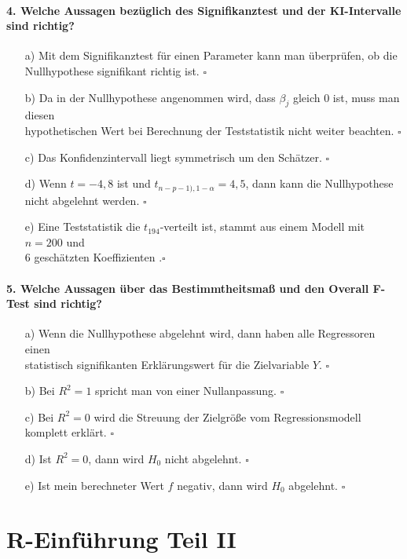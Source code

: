 \documentclass[a4paper]{article}
\begin{document}
\paragraph{4. Welche Aussagen bezüglich des Signifikanztest und der KI-Intervalle sind richtig?}
\begin{itemize}
    \item[a)] Mit dem Signifikanztest für einen Parameter kann man überprüfen, ob die\\ Nullhypothese signifikant richtig ist. \hfill $\square$
    \item[b)] Da in der Nullhypothese angenommen wird, dass $\beta_j$ gleich 0 ist, muss man diesen\\ hypothetischen Wert bei Berechnung der Teststatistik nicht weiter beachten. \hfill $\square$
    \item[c)] Das Konfidenzintervall liegt symmetrisch um den Schätzer. \hfill $\square$
    \item[d)] Wenn $t = -4,8$ ist und $t_{n-p-1),1-\alpha} = 4,5$, dann kann die Nullhypothese\\nicht abgelehnt werden. \hfill $\square$
    \item[e)] Eine Teststatistik die $t_{194}$-verteilt ist, stammt aus einem Modell mit $n = 200$ und\\6 geschätzten Koeffizienten .\hfill $\square$
\end{itemize}

\paragraph{5. Welche Aussagen über das Bestimmtheitsmaß und den Overall F-Test sind richtig?}
\begin{itemize}
    \item[a)] Wenn die Nullhypothese abgelehnt wird, dann haben alle Regressoren einen\\ statistisch signifikanten Erklärungswert für die Zielvariable $Y$. \hfill $\square$
    \item[b)] Bei $R^2=1$ spricht man von einer Nullanpassung. \hfill $\square$
    \item[c)] Bei $R^2=0$ wird die Streuung der Zielgröße vom Regressionsmodell komplett erklärt. \hfill $\square$
    \item[d)] Ist $R^2=0$, dann wird $H_0$ nicht abgelehnt. \hfill $\square$
    \item[e)] Ist mein berechneter Wert $f$ negativ, dann wird $H_0$ abgelehnt. \hfill $\square$
\end{itemize}


\clearpage


\section{R-Einführung Teil II}
\end{document}
